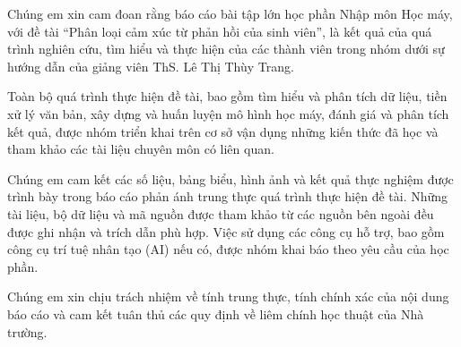 
Chúng em xin cam đoan rằng báo cáo bài tập lớn học phần Nhập môn Học máy, với đề tài “Phân loại cảm xúc từ phản hồi của sinh viên”, là kết quả của quá trình nghiên cứu, tìm hiểu và thực hiện của các thành viên trong nhóm dưới sự hướng dẫn của giảng viên ThS. Lê Thị Thùy Trang.

Toàn bộ quá trình thực hiện đề tài, bao gồm tìm hiểu và phân tích dữ liệu, tiền xử lý văn bản, xây dựng và huấn luyện mô hình học máy, đánh giá và phân tích kết quả, được nhóm triển khai trên cơ sở vận dụng những kiến thức đã học và tham khảo các tài liệu chuyên môn có liên quan.

Chúng em cam kết các số liệu, bảng biểu, hình ảnh và kết quả thực nghiệm được trình bày trong báo cáo phản ánh trung thực quá trình thực hiện đề tài. Những tài liệu, bộ dữ liệu và mã nguồn được tham khảo từ các nguồn bên ngoài đều được ghi nhận và trích dẫn phù hợp. Việc sử dụng các công cụ hỗ trợ, bao gồm công cụ trí tuệ nhân tạo (AI) nếu có, được nhóm khai báo theo yêu cầu của học phần.

Chúng em xin chịu trách nhiệm về tính trung thực, tính chính xác của nội dung báo cáo và cam kết tuân thủ các quy định về liêm chính học thuật của Nhà trường.

